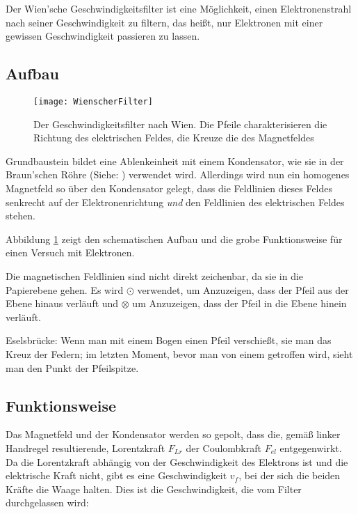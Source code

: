 Der Wien'sche Geschwindigkeitsfilter ist eine Möglichkeit, einen Elektronenstrahl nach seiner Geschwindigkeit zu filtern, das heißt, nur Elektronen mit einer gewissen Geschwindigkeit passieren zu lassen.

\subsection{Aufbau}

\begin{figure}[h!]
	\centering
	\vspace*{-10pt}
	\texttt{[image: WienscherFilter]}
	\caption{Der Geschwindigkeitsfilter nach Wien. Die Pfeile charakterisieren die Richtung des elektrischen Feldes, die Kreuze die des Magnetfeldes}
	\label{fig:Wien}
\end{figure}

Grundbaustein bildet eine Ablenkeinheit mit einem Kondensator, wie sie in der Braun'schen Röhre (Siehe: ) verwendet wird. Allerdings wird nun ein homogenes Magnetfeld so über den Kondensator gelegt, dass die Feldlinien dieses Feldes senkrecht auf der Elektronenrichtung \emph{und} den Feldlinien des elektrischen Feldes stehen.

Abbildung \ref{fig:Wien}  zeigt den schematischen Aufbau und die grobe Funktionsweise für einen Versuch mit Elektronen.


\begin{Anmerkung}
	Die magnetischen Feldlinien sind nicht direkt zeichenbar, da sie \glqq in die Papierebene\grqq{} gehen. Es wird $\odot$ verwendet, um Anzuzeigen, dass der Pfeil aus der Ebene hinaus verläuft und $\otimes$ um Anzuzeigen, dass der Pfeil in die Ebene hinein verläuft.
	
	Eselsbrücke: Wenn man mit einem Bogen einen Pfeil verschießt, sie man das Kreuz der Federn; im letzten Moment, bevor man von einem getroffen wird, sieht man den Punkt der Pfeilspitze.
\end{Anmerkung}



\subsection{Funktionsweise}

Das Magnetfeld und der Kondensator werden so gepolt, dass die, gemäß linker Handregel resultierende, Lorentzkraft $F_{Lr}$ der Coulombkraft $F_{el}$ entgegenwirkt. Da die Lorentzkraft abhängig von der Geschwindigkeit des Elektrons ist und die elektrische Kraft nicht, gibt es eine Geschwindigkeit $v_f$, bei der sich die beiden Kräfte die Waage halten. Dies ist die Geschwindigkeit, die vom Filter durchgelassen wird:


